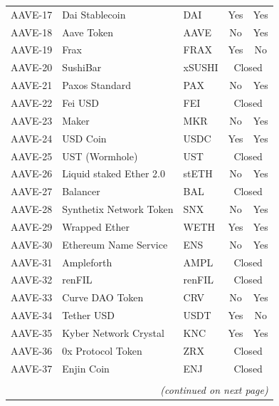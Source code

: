 \begin{table}[ht!]
\begin{tabular*}{\linewidth}{@{\extracolsep{\fill}}lllcc}
    AAVE-17 & Dai Stablecoin & DAI   & Yes   & Yes \\
    AAVE-18 & Aave Token & AAVE  & No    & Yes \\
    AAVE-19 & Frax  & FRAX  & Yes   & No \\
    AAVE-20 & SushiBar & xSUSHI & \multicolumn{2}{c}{Closed} \\
    AAVE-21 & Paxos Standard & PAX   & No    & Yes \\
    AAVE-22 & Fei USD & FEI   & \multicolumn{2}{c}{Closed} \\
    AAVE-23 & Maker & MKR   & No    & Yes \\
    AAVE-24 & USD Coin & USDC  & Yes   & Yes \\
    AAVE-25 & UST (Wormhole) & UST   & \multicolumn{2}{c}{Closed} \\
    AAVE-26 & Liquid staked Ether 2.0 & stETH & No    & Yes \\
    AAVE-27 & Balancer & BAL   & \multicolumn{2}{c}{Closed} \\
    AAVE-28 & Synthetix Network Token & SNX   & No    & Yes \\
    AAVE-29 & Wrapped Ether & WETH  & Yes   & Yes \\
    AAVE-30 & Ethereum Name Service & ENS   & No    & Yes \\
    AAVE-31 & Ampleforth & AMPL  & \multicolumn{2}{c}{Closed} \\
    AAVE-32 & renFIL & renFIL & \multicolumn{2}{c}{Closed} \\
    AAVE-33 & Curve DAO Token & CRV   & No    & Yes \\
    AAVE-34 & Tether USD & USDT  & Yes   & No \\
    AAVE-35 & Kyber Network Crystal & KNC   & Yes   & Yes \\
    AAVE-36 & 0x Protocol Token & ZRX   & \multicolumn{2}{c}{Closed} \\
    AAVE-37 & Enjin Coin & ENJ   & \multicolumn{2}{c}{Closed} \\
    \bottomrule
        \\ \multicolumn{5}{r}{\textit{(continued on next page)}}\\
          \end{tabular*} 

\end{table}%

\clearpage
\newpage


